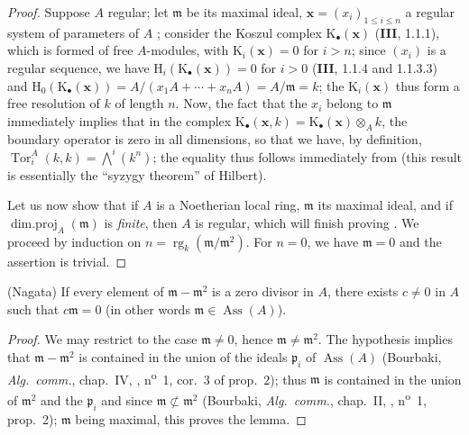 \begin{proof}
Suppose $A$ regular;
let $\mathfrak{m}$ be its maximal ideal, $\mathbf{x}=(x_i)_{1\leq i\leq n}$ a regular system of parameters of $A$ ;
consider the Koszul complex $\mathrm{K}_\bullet(\mathbf{x})$ (\textbf{III}, 1.1.1), which is formed of free $A$-modules, with $\mathrm{K}_i(\mathbf{x})=0$ for $i>n$;
since $(x_i)$ is a regular sequence, we have $\mathrm{H}_i(\mathrm{K}_\bullet(\mathbf{x}))=0$ for $i>0$ (\textbf{III}, 1.1.4 and 1.1.3.3) and $\mathrm{H}_0(\mathrm{K}_\bullet(\mathbf{x}))=A/(x_1 A+\cdots+x_n A)=A/\mathfrak{m}=k$;
the $\mathrm{K}_i(\mathbf{x})$ thus form a free resolution of $k$ of length $n$.
Now, the fact that the $x_i$ belong to $\mathfrak{m}$ immediately implies that in the complex $\mathrm{K}_\bullet(\mathbf{x},k)=\mathrm{K}_\bullet(\mathbf{x})\otimes_A k$, the boundary operator is zero in all dimensions, so that we have, by definition, $\operatorname{Tor}^A_i(k,k)=\textstyle\bigwedge^i(k^n)$;
the equality  thus follows immediately from  (this result is essentially the ``syzygy theorem'' of Hilbert).

Let us now show that if $A$ is a Noetherian local ring, $\mathfrak{m}$ its maximal ideal, and if $\operatorname{dim.proj}_A(\mathfrak{m})$ is \emph{finite}, then $A$ is regular, which will finish proving .
We proceed by induction on $n=\operatorname{rg}_k(\mathfrak{m}/\mathfrak{m}^2)$.
For $n=0$, we have $\mathfrak{m}=0$ and the assertion is trivial.
\end{proof}

\begin{lemma}[17.3.1.2]
\label{0.17.3.1.2}
\textnormal{(Nagata)}
If every element of $\mathfrak{m}-\mathfrak{m}^2$ is a zero divisor in $A$, there exists $c\neq 0$ in $A$ such that $c\mathfrak{m}=0$ (in other words $\mathfrak{m}\in\operatorname{Ass}(A)$).
\end{lemma}

\begin{proof}
We may restrict to the case $\mathfrak{m}\neq 0$, hence $\mathfrak{m}\neq\mathfrak{m}^2$.
The hypothesis implies that $\mathfrak{m}-\mathfrak{m}^2$ is contained in the union of the ideals $\mathfrak{p}_i$ of $\operatorname{Ass}(A)$ (Bourbaki, \emph{Alg.~comm.}, chap.~IV, , n\textsuperscript{o}~1, cor.~3 of prop.~2);
thus $\mathfrak{m}$ is contained in the union of $\mathfrak{m}^2$ and the $\mathfrak{p}_i$ and since $\mathfrak{m}\not\subset\mathfrak{m}^2$ (Bourbaki, \emph{Alg.~comm.}, chap.~II, , n\textsuperscript{o}~1, prop.~2);
$\mathfrak{m}$ being maximal, this proves the lemma.
\end{proof}

